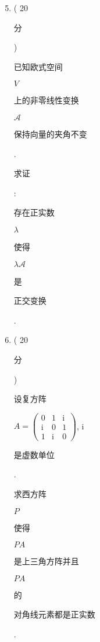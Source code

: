 \documentclass[10pt]{article}
\begin{document}
\begin{enumerate}
  \setcounter{enumi}{4}
  \item ( 20 \begin{CJK}{UTF8}{mj}分\end{CJK}) \begin{CJK}{UTF8}{mj}已知欧式空间\end{CJK} $V$ \begin{CJK}{UTF8}{mj}上的非零线性变换\end{CJK} $\mathscr{A}$ \begin{CJK}{UTF8}{mj}保持向量的夹角不变\end{CJK}. \begin{CJK}{UTF8}{mj}求证\end{CJK}: \begin{CJK}{UTF8}{mj}存在正实数\end{CJK} $\lambda$ \begin{CJK}{UTF8}{mj}使得\end{CJK} $\lambda \mathscr{A}$ \begin{CJK}{UTF8}{mj}是\end{CJK} \begin{CJK}{UTF8}{mj}正交变换\end{CJK}.

  \item ( 20 \begin{CJK}{UTF8}{mj}分\end{CJK}) \begin{CJK}{UTF8}{mj}设复方阵\end{CJK} $A=\left(\begin{array}{lll}0 & 1 & \mathrm{i} \\ \mathrm{i} & 0 & 1 \\ 1 & \mathrm{i} & 0\end{array}\right)$, i \begin{CJK}{UTF8}{mj}是虚数单位\end{CJK}. \begin{CJK}{UTF8}{mj}求西方阵\end{CJK} $P$ \begin{CJK}{UTF8}{mj}使得\end{CJK} $P A$ \begin{CJK}{UTF8}{mj}是上三角方阵并且\end{CJK} $P A$ \begin{CJK}{UTF8}{mj}的\end{CJK} \begin{CJK}{UTF8}{mj}对角线元素都是正实数\end{CJK}.

\end{enumerate}
\end{document}

